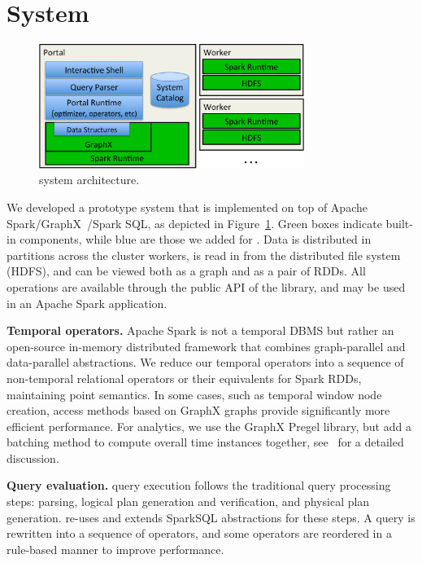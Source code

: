 \section{System}
\label{sec:sys}

\begin{figure}[t]
\centering
\includegraphics[width=3.4in]{figs/architecture.pdf}
\vspace{-0.4cm}
\caption{\sys system architecture.}
\vspace{-0.4cm}
\label{fig:arch}
\end{figure}

We developed a prototype system \sys that is implemented on top of
Apache Spark/GraphX~\cite{DBLP:conf/osdi/GonzalezXDCFS14}/Spark SQL,
as depicted in Figure~\ref{fig:arch}.  Green boxes indicate built-in
components, while blue are those we added for \sys.  Data is
distributed in partitions across the cluster workers, is read in from
the distributed file system (HDFS), and can be viewed both as a graph
and as a pair of RDDs.  All \tg operations are available through the
public API of the \sys library, and may be used in an Apache Spark
application.

{\bf Temporal operators.}  Apache Spark is not a temporal DBMS but
rather an open-source in-memory distributed framework that combines
graph-parallel and data-parallel abstractions.  We reduce our temporal
operators into a sequence of non-temporal relational operators or their
equivalents for Spark RDDs, maintaining point semantics.  In some
cases, such as temporal window node creation, access methods based on
GraphX graphs provide significantly more efficient performance.  For
analytics, we use the GraphX Pregel library, but add a batching method
to compute overall time instances together,
see~\cite{MoffittTempWeb16} for a detailed discussion.

{\bf Query evaluation.}  \sys query execution follows the traditional
query processing steps: parsing, logical plan generation and
verification, and physical plan generation. \sys re-uses and extends
SparkSQL abstractions for these steps.  A \ql query is rewritten into
a sequence of \tga operators, and some operators are reordered in a
rule-based manner to improve performance. 

